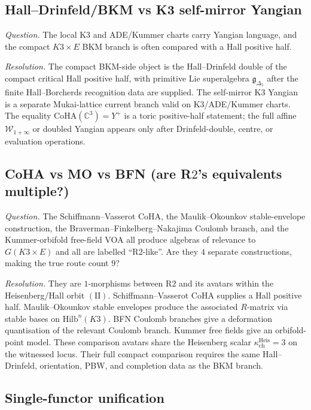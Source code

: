 \documentclass[11pt]{article}
\begin{document}
\subsection{Hall--Drinfeld/BKM vs K3 self-mirror Yangian}
\label{subsec:hall-drinfeld-vs-yangian}

\emph{Question.} The local K3 and ADE/Kummer charts carry Yangian
language, and the compact $K3\times E$ BKM branch is often compared
with a Hall positive half.

\emph{Resolution.} The compact BKM-side object is the
Hall--Drinfeld double of the compact critical Hall positive half,
with primitive Lie superalgebra $\mathfrak g_{\Delta_5}$ after the
finite Hall--Borcherds recognition data are supplied. The
self-mirror K3 Yangian is a separate Mukai-lattice current branch
valid on K3/ADE/Kummer charts. The equality
$\mathrm{CoHA}(\mathbb C^3)=Y^+$ is a toric positive-half statement;
the full affine $\mathcal W_{1+\infty}$ or doubled Yangian appears
only after Drinfeld-double, centre, or evaluation operations.

\subsection{CoHA vs MO vs BFN (are R$2$'s equivalents
multiple?)}
\label{subsec:route-coha-mo-bfn}

\emph{Question.} The Schiffmann--Vasserot CoHA, the Maulik--Okounkov
stable-envelope construction, the Braverman--Finkelberg--Nakajima
Coulomb branch, and the Kummer-orbifold free-field VOA all produce
algebras of relevance to $G(K3 \times E)$ and all are labelled
``R$2$-like''. Are they $4$ separate constructions, making the
true route count $9$?

\emph{Resolution.} They are $1$-morphisms between R$2$ and its avatars
within the Heisenberg/Hall orbit $(\mathrm{II})$. Schiffmann--Vasserot
CoHA supplies a Hall positive half. Maulik--Okounkov stable envelopes
produce the associated $R$-matrix via stable bases on
$\mathrm{Hilb}^n(K3)$. BFN Coulomb branches give a deformation
quantisation of the relevant Coulomb branch. Kummer free fields give
an orbifold-point model. These comparison avatars share the
Heisenberg scalar $\kappa_{\mathrm{ch}}^{\mathrm{Heis}}=3$ on the
witnessed locus. Their full compact comparison requires the same
Hall--Drinfeld, orientation, PBW, and completion data as the BKM
branch.

\subsection{Single-functor unification}
\label{subsec:route-single-functor}
\end{document}
